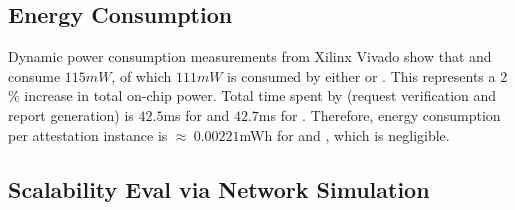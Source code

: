 \subsection{Energy Consumption}\label{subsec:energy-overhead}

Dynamic power consumption measurements from Xilinx Vivado show that \trapscasu{} and \trapsrata{} consume $115 mW$, of which $111 mW$ is consumed
by either \casu or \rata. This represents a $2$\% increase in total on-chip power.
Total time spent by \system (request verification and report generation) is $42.5$ms for \trapscasu and 
$42.7$ms for \trapsrata. Therefore, energy consumption per attestation instance is $\approx~0.00221$mWh 
for \trapscasu and \trapsrata, which is negligible.

\subsection{Scalability Eval via Network Simulation} \label{sec:network-simulation}

